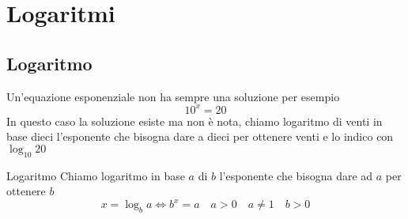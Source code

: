 \chapter{Logaritmi}
\label{sec:Logaritmi}
\section{Logaritmo}
\label{sec:Lograritmo}
Un'equazione esponenziale non ha sempre una soluzione per esempio \[10^x=20\] In questo caso la soluzione esiste ma non è nota, chiamo logaritmo di venti in base dieci l'esponente che bisogna dare a dieci per ottenere venti e lo indico con $\log_{10}20$
\begin{definizionet}{Logaritmo}{}
	Chiamo logaritmo in base $a$ di $b$ l'esponente che bisogna dare ad $a$ per ottenere $b$ \[x=\log_ba\Leftrightarrow b^{x}=a\quad a>0\quad a\neq  1\quad b>0 \]
\end{definizionet} 
